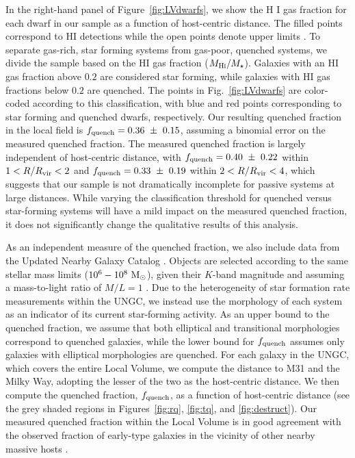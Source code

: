 \documentclass[usenatbib]{mnras}
\newcommand{\rvir}{R_{\rm vir}}
\newcommand{\mstar}{{M}_{\star}}
\newcommand{\msun}{{\rm M}_{\odot}}
\begin{document}
In the right-hand panel of Figure~\ref{fig:LVdwarfs}, we show the H{\scriptsize
  I} gas fraction for each dwarf in our sample as a function of host-centric
distance. The filled points correspond to H{\scriptsize I} detections while the
open points denote upper limits \citep{hunter12, spekkens14, mcconnachie12}.
%
To separate gas-rich, star forming systems from gas-poor, quenched systems, we
divide the sample based on the H{\scriptsize I} gas fraction
($M_{\rm H\protect\scalebox{0.55}{\rm I}}/\mstar$). Galaxies with an
H{\scriptsize I} gas fraction above $0.2$ are considered star forming, while
galaxies with H{\scriptsize I} gas fractions below $0.2$ are quenched. The
points in Fig.~\ref{fig:LVdwarfs} are color-coded according to this
classification, with blue and red points corresponding to star forming and
quenched dwarfs, respectively.
%
Our resulting quenched fraction in the local field is
$f_{\rm quench} = 0.36~\pm~0.15$, assuming a binomial error on the measured
quenched fraction.
%
The measured quenched fraction is largely independent of host-centric distance,
with $f_{\rm quench} = 0.40~\pm~0.22$ within $1 < R/\rvir < 2$ and
$f_{\rm quench} = 0.33~\pm~0.19$ within $2 < R/\rvir < 4$, which suggests that
our sample is not dramatically incomplete for passive systems at large
distances.
%
While varying the classification threshold for quenched versus star-forming
systems will have a mild impact on the measured quenched fraction, it does not
significantly change the qualitative results of this analysis.



As an independent measure of the quenched fraction, we also include
data from the Updated Nearby Galaxy Catalog
\citep[UNGC,][]{karachentsev13a}.
%
Objects are selected according to the same stellar mass limits
($10^{6}-10^{8}~\msun$), given their $K$-band magnitude and assuming a
mass-to-light ratio of $M/L = 1$ \citep{bell01}.
%
Due to the heterogeneity of star formation rate measurements within the UNGC, we
instead use the morphology of each system as an indicator of its current
star-forming activity. As an upper bound to the quenched fraction, we assume
that both elliptical and transitional morphologies correspond to quenched
galaxies, while the lower bound for $f_{\rm quench}$ assumes only galaxies with
elliptical morphologies are quenched.
%
For each galaxy in the UNGC, which covers the entire Local Volume, we compute
the distance to M31 and the Milky Way, adopting the lesser of the two as the
host-centric distance.
%
We then compute the quenched fraction, $f_{\rm quench}$, as a function of
host-centric distance (see the grey shaded regions in Figures~\ref{fig:rq},
\ref{fig:tq}, and \ref{fig:destruct}).
%
Our measured quenched fraction within the Local Volume is in good
  agreement with the observed fraction of early-type galaxies in the vicinity of
  other nearby massive hosts \citep{karachentsev15c}.
\end{document}
